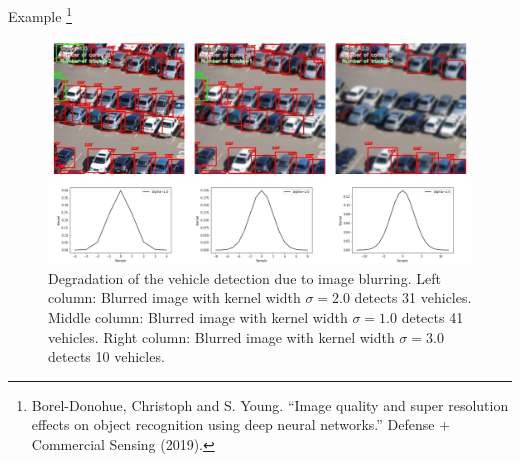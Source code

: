\documentclass{libs/ufc_format}
\begin{document}
\begin{frame}{Example \footnote[frame]{\tiny Borel-Donohue, Christoph and S. Young. “Image quality and super resolution effects on object recognition using deep neural networks.” Defense + Commercial Sensing (2019).}}
    \begin{figure}
        \centering
        \includegraphics[scale=0.18]{libs/blureffect.png}
        \caption{Degradation of the vehicle detection due to image blurring. Left column: Blurred image with kernel width $\sigma=2.0$ detects 31 vehicles. Middle column: Blurred image with kernel width $\sigma=1.0$ detects 41 vehicles. Right column: Blurred image with kernel width $\sigma=3.0$ detects 10 vehicles.}       
        \label{fig:challenge}
    \end{figure}

\end{frame}
\end{document}
